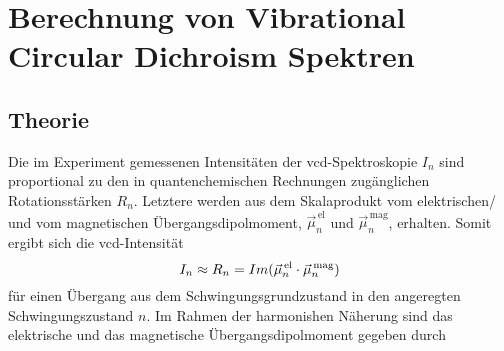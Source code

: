 \section{Berechnung von Vibrational Circular Dichroism Spektren}
	\subsection{Theorie}
	Die im Experiment gemessenen Intensitäten der \ac{vcd}-Spektroskopie $I_n$ sind proportional zu den in quantenchemischen Rechnungen zugänglichen Rotationsstärken $R_n$. Letztere werden aus dem Skalaprodukt vom elektrischen/ und vom magnetischen Übergangsdipolmoment, $\vec{\mu}_n^{\,\text{el}}$ und $\vec{\mu}_n^{\,\text{mag}}$,  erhalten. Somit ergibt sich die \ac{vcd}-Intensität
	\begin{equation}
	  I_n\approx R_n = Im(\vec{\mu}_n^{\,\text{el}}\cdot\vec{\mu}_n^{\text{\,mag}})
	\end{equation}
	für einen Übergang aus dem Schwingungsgrundzustand in den angeregten Schwingungszustand $n$.\supercite{stephens1985theory,stephens1985vibrational} Im Rahmen der harmonishen Näherung sind das elektrische und das magnetische Übergangsdipolmoment gegeben durch\supercite{cheeseman1996ab,nicu2008vibrational}
	
